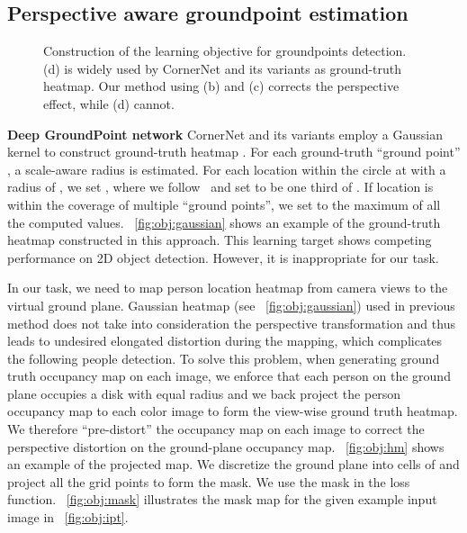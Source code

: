 \documentclass{article}
\begin{document}
\subsection{Perspective aware groundpoint estimation}
\label{sec:heatmap}








\begin{figure}
	\begin{center}
	\end{center}
	\caption{Construction of the learning objective for groundpoints detection. (d) is widely used by CornerNet and its variants as ground-truth heatmap.
	Our method using (b) and (c) corrects the perspective effect, while (d) cannot. }
	\label{fig:obj}
\end{figure}

\textbf{Deep GroundPoint network} CornerNet and its variants employ a Gaussian kernel to construct ground-truth heatmap . For each ground-truth ``ground point'' , a scale-aware radius
 is estimated. For each location  within the circle at  with a radius of , 
we set , where we follow~\cite{law2018cornernet} and set  to be one third of  . If location  is within the coverage of multiple ``ground points'', we set  to the maximum of all the computed values.  
\figurename{~\ref{fig:obj:gaussian}} shows an example of the ground-truth heatmap constructed in this approach.
This learning target shows competing performance on 2D object detection. However, it is inappropriate for our task.

In our task, we need to map person location heatmap from camera views to the virtual
ground plane. Gaussian heatmap (see \figurename{~\ref{fig:obj:gaussian}}) used in previous method does not take into consideration the
perspective transformation and thus
leads to undesired elongated distortion during the mapping, which complicates
the following people detection. To solve this problem,
when generating ground truth occupancy map on each image, we enforce that each person on the ground plane occupies a disk with equal radius and we
back project the person occupancy map to each color image to form the view-wise ground truth heatmap.
We therefore ``pre-distort'' the occupancy map on each image to correct the perspective distortion
on the ground-plane occupancy map.
\figurename{~\ref{fig:obj:hm}} shows an example of the projected map. 
We discretize the ground plane into cells of  and project all the grid points to form the mask. 
We use the mask in the loss function.
\figurename{~\ref{fig:obj:mask}} illustrates the mask map for the given example input image in \figurename{~\ref{fig:obj:ipt}}.
\end{document}
